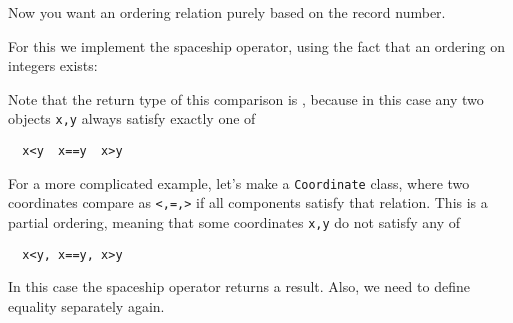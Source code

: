 Now you want an ordering relation purely based on the record number.

For this we implement the spaceship operator,
using the fact that an ordering on integers exists:

Note that the return type of this comparison is
,
because in this case any two objects \lstinline{x,y}
always satisfy exactly one of
\begin{lstlisting}
  x<y  x==y  x>y
\end{lstlisting}

For a more complicated example, let's make a \lstinline{Coordinate} class,
where two coordinates compare as
\lstinline|<,=,>|
if all components satisfy that relation.
This is a partial ordering,
meaning that some coordinates \lstinline{x,y}
do not satisfy any of
\begin{lstlisting}
  x<y, x==y, x>y
\end{lstlisting}

In this case the spaceship operator returns a
 result.
Also, we need to define equality separately again.

